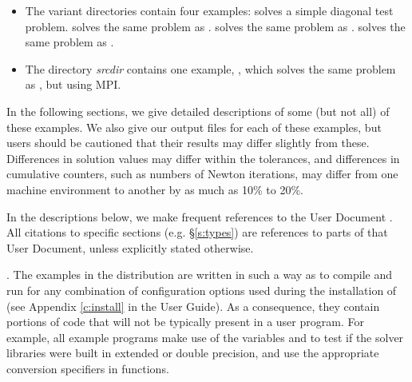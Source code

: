 \begin{itemize}

\item The  variant directories contain four examples:
   solves a simple diagonal test problem.
   solves the same problem as .
   solves the same problem as
  .
   solves the same problem as .

\item The directory
{\em srcdir} contains one
example, , which solves
the same problem as , but using MPI.
\end{itemize}


\vspace{0.2in}\noindent
In the following sections, we give detailed descriptions of some (but
not all) of these examples.  We also give our output files for
each of these examples, but users should be cautioned that their
results may differ slightly from these.  Differences in solution
values may differ within the tolerances, and differences in cumulative
counters, such as numbers of Newton iterations, may differ
from one machine environment to another by as much as 10\% to 20\%.

In the descriptions below, we make frequent references to the {\kinsol}
User Document \cite{kinsol_ug}.  All citations to specific sections
(e.g. \S\ref{s:types}) are references to parts of that User Document, unless
explicitly stated otherwise.

\vspace{0.2in}.
The examples in the {\kinsol} distribution are written in such a way as
to compile and run for any combination of configuration options used during
the installation of {\sundials} (see Appendix \ref{c:install} in the User Guide).
As a consequence, they contain portions of code that will not be typically present in a
user program. For example, all {\CC} example programs make use of the
variables  and 
to test if the solver libraries were built in extended or double precision,
and use the appropriate conversion specifiers in  functions.
